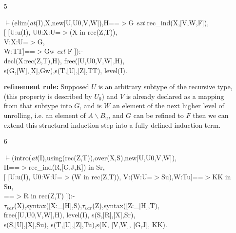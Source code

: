 \documentclass[11pt]{report}
\begin{document}
 \begin{enumerate}
  
 \item[5]
\begin{sf}\begin{tabbing}
$\vdash$(elim(\mbox{\it at}(I),X,new[U,U0,V,W]),H==$>$G \mbox{\it ext} rec\_\hspace{0.1em}ind(X,[V,W,F]),\\[-0.15ex]
\hspace{2em}[ [U:u(I), U0:X:U=$>$(X in rec(Z,T)), \\[-0.15ex]
\hspace{3em}V:X:U=$>$G, \\[-0.15ex]
\hspace{3em}W:TT]==$>$Gw \mbox{\it ext} F ]):-\\[-0.15ex]
\hspace{2em}decl(X:rec(Z,T),H), free([U,U0,V,W],H), \\[-0.15ex]
\hspace{2em}s(G,[W],[X],Gw),s(T,[U],[Z],TT), level(I).
\end{tabbing}\end{sf}

 {\bf refinement rule:}
 Supposed $U$ is an arbitrary subtype of the recursive type,
 (this property is described by $U_0$)
 and $V$ is already declared as a mapping from that subtype
 into $G$, and is $W$ an element of the next higher
 level of unrolling, i.e. an element of $A\backslash B_u$,
 and $G$ can be refined to $F$ then we can extend this 
 structural induction step into a fully defined induction term.   
 \item[6]
\begin{sf}\begin{tabbing}
$\vdash$(intro(\mbox{\it at}(I),using(rec(Z,T)),over(X,S),new[U,U0,V,W]),\\[-0.15ex]
\hspace{2em}H==$>$rec\_\hspace{0.1em}ind(R,[G,J,K]) in Sr,\\[-0.15ex]
\hspace{2em}[ [U:u(I), U0:W:U=$>$(W in rec(Z,T)), V:(W:U=$>$Su),W:Tu]==$>$KK in Su, \\[-0.15ex]
\hspace{3em}==$>$R in rec(Z,T) ]):-\\[-0.15ex]
\hspace{2em}$\tau_{var}$(X),syntax([X:\_\hspace{0.1em}$\mid$H],S),$\tau_{var}$(Z),syntax([Z:\_\hspace{0.1em}$\mid$H],T),\\[-0.15ex]
\hspace{2em}free([U,U0,V,W],H), level(I), s(S,[R],[X],Sr),\\[-0.15ex]
\hspace{2em}s(S,[U],[X],Su), s(T,[U],[Z],Tu),s(K, [V,W], [G,J], KK). 
\end{tabbing}\end{sf}


\end{enumerate}
\end{document}
